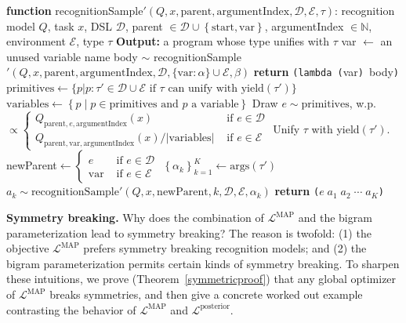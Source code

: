 \documentclass{article}
\newcommand{\code}[1]{{\footnotesize\texttt{#1}}}
\begin{document}
\begin{algorithm}
\begin{algorithmic}[1]
     \State \textbf{function} recognitionSample$'(Q, x, \text{parent}, \text{argumentIndex}, \mathcal{D}, \mathcal{E}, \tau)$:
      recognition model $Q$, task $x$, DSL $\mathcal{D}$, parent $\in \mathcal{D}\cup\left\{\text{start},\text{var} \right\}$, argumentIndex $\in \mathbb{N}$, environment $\mathcal{E}$, type $\tau$
     \State \textbf{Output:} a program whose type unifies with $\tau$
     \If{$\tau = \alpha\to\beta$}
     \State var $\gets$ an unused variable name
     \State body $\sim$ recognitionSample$'(Q,x,\text{parent},\text{argumentIndex},\mathcal{D},\{\text{var}:\alpha\}\cup\mathcal{E},\beta)$%
     \State \textbf{return} \code{(lambda (}var\code{) }body\code{)}
     \Else{}
     \State $\text{primitives} \gets \{p | p: \tau' \in \mathcal{D}\cup\mathcal{E}$
     $\text{if }\tau\text{ can unify with yield}(\tau') \}$
     \State $\text{variables}\gets\left\{p\;|\;p\in \text{primitives}\text{ and }p\text{ a variable} \right\}$
     \State Draw $e\sim \text{primitives}$, w.p. $\propto\begin{cases}
       Q_{\text{parent},e,\text{argumentIndex}}(x)&\text{ if }e\in \mathcal{D}\\
Q_{\text{parent},\text{var},\text{argumentIndex}}(x)/|\text{variables}|&\text{ if }e\in \mathcal{E}
       \end{cases}$
     \State Unify $\tau$ with yield$(\tau')$.
     \State newParent$\gets\begin{cases}
     e &\text{ if }e\in \mathcal{D}\\
     \text{var}&\text{ if }e\in \mathcal{E}\end{cases}$
     \State $\left\{\alpha_k \right\}_{k = 1}^K\gets\text{args}(\tau')$ 
     \State $a_k\sim\text{recognitionSample}'(Q,x,\text{newParent},k,\mathcal{D},\mathcal{E},\alpha_k)$
     \EndFor
     \State \textbf{return} \code{(}$e\;a_1\; a_2\; \cdots\; a_K$\code{)}
     \EndIf
   \end{algorithmic}
 \end{algorithm}

 \noindent \textbf{Symmetry breaking.}  Why does the combination of
 $\mathcal{L}^{\text{MAP}}$ and the bigram parameterization lead to
 symmetry breaking?  The reason is twofold: (1) the objective
 $\mathcal{L}^{\text{MAP}}$ prefers symmetry breaking recognition
 models; and (2) the bigram parameterization permits certain kinds of
 symmetry breaking.
 To sharpen these intuitions,
 we prove (Theorem~\ref{symmetricproof})
 that any global optimizer of $\mathcal{L}^{\text{MAP}}$
 breaks symmetries,
 and then give a concrete worked out example
 contrasting the behavior of $\mathcal{L}^{\text{MAP}}$ and $\mathcal{L}^{\text{posterior}}$.
 
\end{document}
